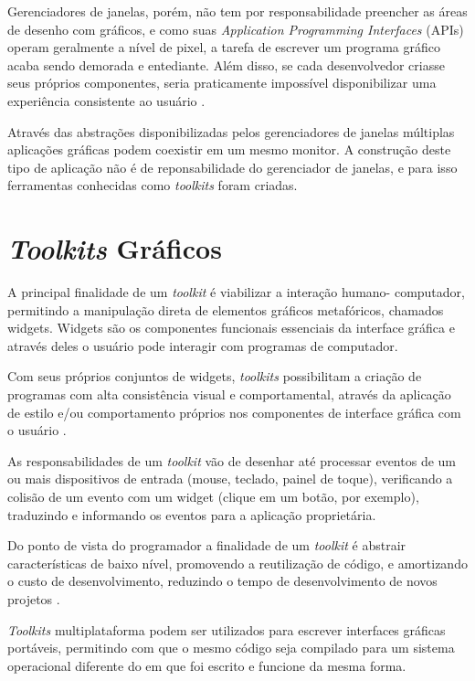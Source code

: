 Gerenciadores de janelas, porém, não tem por responsabilidade preencher as áreas
de desenho com gráficos, e como suas \textit{Application Programming Interfaces}
(APIs) operam geralmente a nível de pixel, a tarefa de escrever um programa
gráfico acaba sendo demorada e entediante. Além disso, se cada desenvolvedor
criasse seus próprios componentes, seria praticamente impossível disponibilizar
uma experiência consistente ao usuário
.

Através das abstrações disponibilizadas pelos gerenciadores de janelas múltiplas
aplicações gráficas podem coexistir em um mesmo monitor. A construção deste tipo
de aplicação não é de reponsabilidade do gerenciador de janelas, e para isso
ferramentas conhecidas como \textit{toolkits} foram criadas.

\section{\textit{Toolkits} Gráficos}

A principal finalidade de um \textit{toolkit} é viabilizar a interação humano-
computador, permitindo a manipulação direta de elementos gráficos metafóricos,
chamados widgets. Widgets são os componentes funcionais essenciais da interface
gráfica e através deles o usuário pode interagir com programas de computador.

Com seus próprios conjuntos de widgets, \textit{toolkits} possibilitam a criação
de programas com alta consistência visual e comportamental, através da aplicação
de estilo e/ou comportamento próprios nos componentes de interface gráfica com o
usuário \cite{myers2000past}.

As responsabilidades de um \textit{toolkit} vão de desenhar até processar
eventos de um ou mais dispositivos de entrada (mouse, teclado, painel de toque),
verificando a colisão de um evento com um widget (clique em um botão, por
exemplo), traduzindo e informando os eventos para a aplicação proprietária.

Do ponto de vista do programador a finalidade de um \textit{toolkit} é abstrair
características de baixo nível, promovendo a reutilização de código, e
amortizando o custo de desenvolvimento, reduzindo o tempo de desenvolvimento de
novos projetos \cite{haefliger2008code}.

\textit{Toolkits} multiplataforma podem ser utilizados para escrever interfaces
gráficas portáveis, permitindo com que o mesmo código seja compilado para um
sistema operacional diferente do em que foi escrito e funcione da mesma forma.

